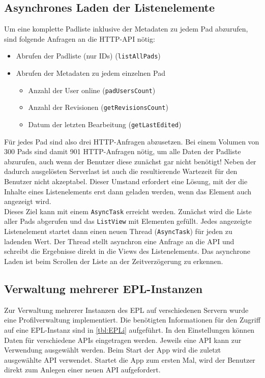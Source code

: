 \subsection{Asynchrones Laden der Listenelemente}
Um eine komplette Padliste inklusive der Metadaten zu jedem Pad abzurufen, sind folgende Anfragen an die HTTP-API nötig:
\begin{itemize}
	\item Abrufen der Padliste (nur IDs) (\texttt{listAllPads})
	\item Abrufen der Metadaten zu jedem einzelnen Pad
		\begin{itemize}
			\item Anzahl der User online (\texttt{padUsersCount})
			\item Anzahl der Revisionen (\texttt{getRevisionsCount})
			\item Datum der letzten Bearbeitung (\texttt{getLastEdited})
		\end{itemize}
\end{itemize}

Für jedes Pad sind also drei HTTP-Anfragen abzusetzen.
Bei einem Volumen von 300 Pads sind damit 901 HTTP-Anfragen nötig, um alle Daten der Padliste abzurufen, auch wenn der Benutzer diese zunächst gar nicht benötigt!
Neben der dadurch ausgelösten Serverlast ist auch die resultierende Wartezeit für den Benutzer nicht akzeptabel.
Dieser Umstand erfordert eine Lösung, mit der die Inhalte eines Listenelements erst dann geladen werden, wenn das Element auch angezeigt wird.\\
Dieses Ziel kann mit einem \texttt{AsyncTask} erreicht werden.
Zunächst wird die Liste aller Pads abgerufen und das \texttt{ListView} mit Elementen gefüllt. Jedes angezeigte Listenelement startet dann einen neuen Thread (\texttt{AsyncTask}) für jeden zu ladenden Wert.
Der Thread stellt asynchron eine Anfrage an die API und schreibt die Ergebnisse direkt in die Views des Listenelements.
Das asynchrone Laden ist beim Scrollen der Liste an der Zeitverzögerung zu erkennen.

\newpage
\subsection{Verwaltung mehrerer EPL-Instanzen}
\label{sub:implem:eplinstanzen}
Zur Verwaltung mehrerer Instanzen des EPL auf verschiedenen Servern wurde eine Profilverwaltung implementiert.
Die benötigten Informationen für den Zugriff auf eine EPL-Instanz sind in \autoref{tbl:EPLi} aufgeführt.
In den Einstellungen können Daten für verschiedene APIs eingetragen werden.
Jeweils eine API kann zur Verwendung ausgewählt werden.
Beim Start der App wird die zuletzt ausgewählte API verwendet.
Startet die App zum ersten Mal, wird der Benutzer direkt zum Anlegen einer neuen API aufgefordert.

